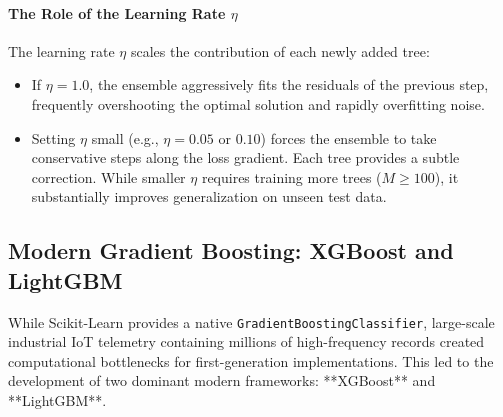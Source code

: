 \paragraph{The Role of the Learning Rate $\eta$}
The learning rate $\eta$ scales the contribution of each newly added tree:
\begin{itemize}
    \item If $\eta = 1.0$, the ensemble aggressively fits the residuals of the previous step, frequently overshooting the optimal solution and rapidly overfitting noise.
    \item Setting $\eta$ small (e.g., $\eta = 0.05$ or $0.10$) forces the ensemble to take conservative steps along the loss gradient. Each tree provides a subtle correction. While smaller $\eta$ requires training more trees ($M \ge 100$), it substantially improves generalization on unseen test data.
\end{itemize}

\subsection{Modern Gradient Boosting: XGBoost and LightGBM}\label{subsec:xgboost_lightgbm}

While Scikit-Learn provides a native \texttt{GradientBoostingClassifier}, large-scale industrial IoT telemetry containing millions of high-frequency records created computational bottlenecks for first-generation implementations. This led to the development of two dominant modern frameworks: **XGBoost** and **LightGBM**.

